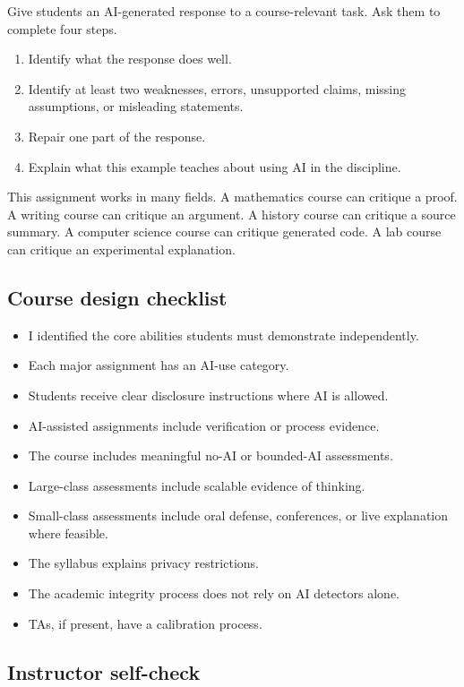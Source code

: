 \documentclass{SIAMbook2023}
\begin{document}
Give students an AI-generated response to a course-relevant task. Ask them to complete four steps.

\begin{enumerate}
\item Identify what the response does well.
\item Identify at least two weaknesses, errors, unsupported claims, missing assumptions, or misleading statements.
\item Repair one part of the response.
\item Explain what this example teaches about using AI in the discipline.
\end{enumerate}

This assignment works in many fields. A mathematics course can critique a proof. A writing course can critique an argument. A history course can critique a source summary. A computer science course can critique generated code. A lab course can critique an experimental explanation.

\clearpage
\subsection{Course design checklist}
\label{i:app:course-checklist}

\begin{itemize}[label=$\square$]
\item I identified the core abilities students must demonstrate independently.
\item Each major assignment has an AI-use category.
\item Students receive clear disclosure instructions where AI is allowed.
\item AI-assisted assignments include verification or process evidence.
\item The course includes meaningful no-AI or bounded-AI assessments.
\item Large-class assessments include scalable evidence of thinking.
\item Small-class assessments include oral defense, conferences, or live explanation where feasible.
\item The syllabus explains privacy restrictions.
\item The academic integrity process does not rely on AI detectors alone.
\item TAs, if present, have a calibration process.
\end{itemize}

\subsection{Instructor self-check}
\label{i:app:instructor-self-check}
\end{document}
